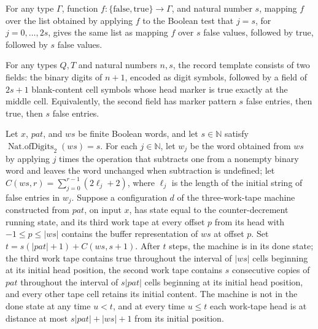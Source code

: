 \begin{theorem}
\label{Turing.rt_centeredWord}
\leanok
{}
For any type $\Gamma$, function $f:\{\mathrm{false},\mathrm{true}\}\to\Gamma$, and
natural number $s$, mapping $f$ over the list obtained by applying $f$ to the Boolean
test that $j=s$, for $j=0,\ldots,2s$, gives the same list as mapping $f$ over $s$ false
values, followed by true, followed by $s$ false values.
\end{theorem}

\begin{theorem}
\label{Turing.rt_template_fields}
\leanok
{}
For any types $Q,T$ and natural numbers $n,s$, the record template consists of two
fields: the binary digits of $n+1$, encoded as digit symbols, followed by a field of
$2s+1$ blank-content cell symbols whose head marker is true exactly at the middle cell.
Equivalently, the second field has marker pattern $s$ false entries, then true, then $s$
false entries.
\end{theorem}

\begin{theorem}
\label{Turing.rt_expand_run}
\leanok
{}
Let $x$, $pat$, and $ws$ be finite Boolean words, and let $s\in\mathbb{N}$ satisfy
$\operatorname{Nat.ofDigits}_2(ws)=s$. For each $j\in\mathbb{N}$, let $w_j$ be the word
obtained from $ws$ by applying $j$ times the operation that subtracts one from a
nonempty binary word and leaves the word unchanged when subtraction is undefined; let
$C(ws,r)=\sum_{j=0}^{r-1}(2\ell_j+2)$, where $\ell_j$ is the length of the initial
string of false entries in $w_j$. Suppose a configuration $d$ of the three-work-tape
machine constructed from $pat$, on input $x$, has state equal to the counter-decrement
running state, and its third work tape at every offset $p$ from its head with $-1\le
p\le |ws|$ contains the buffer representation of $ws$ at offset $p$. Set
$t=s(|pat|+1)+C(ws,s+1)$. After $t$ steps, the machine is in its done state; the third
work tape contains true throughout the interval of $|ws|$ cells beginning at its initial
head position, the second work tape contains $s$ consecutive copies of $pat$ throughout
the interval of $s|pat|$ cells beginning at its initial head position, and every other
tape cell retains its initial content. The machine is not in the done state at any time
$u<t$, and at every time $u\le t$ each work-tape head is at distance at most
$s|pat|+|ws|+1$ from its initial position.
\end{theorem}

